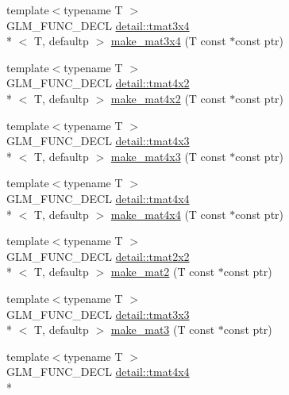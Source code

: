 \begin{DoxyCompactItemize}
{\footnotesize template$<$typename T $>$ }\\G\-L\-M\-\_\-\-F\-U\-N\-C\-\_\-\-D\-E\-C\-L \hyperlink{structglm_1_1detail_1_1tmat3x4}{detail\-::tmat3x4}\\*
$<$ T, defaultp $>$ \hyperlink{group__gtc__type__ptr_gaa0c07ac459a5e16374aa12e3b35ee043}{make\-\_\-mat3x4} (T const $\ast$const ptr)
\item 
{\footnotesize template$<$typename T $>$ }\\G\-L\-M\-\_\-\-F\-U\-N\-C\-\_\-\-D\-E\-C\-L \hyperlink{structglm_1_1detail_1_1tmat4x2}{detail\-::tmat4x2}\\*
$<$ T, defaultp $>$ \hyperlink{group__gtc__type__ptr_gae4ad99adfe4fb195a192712a71de901d}{make\-\_\-mat4x2} (T const $\ast$const ptr)
\item 
{\footnotesize template$<$typename T $>$ }\\G\-L\-M\-\_\-\-F\-U\-N\-C\-\_\-\-D\-E\-C\-L \hyperlink{structglm_1_1detail_1_1tmat4x3}{detail\-::tmat4x3}\\*
$<$ T, defaultp $>$ \hyperlink{group__gtc__type__ptr_ga37ec66362c22d86ad2ee11930b638c4a}{make\-\_\-mat4x3} (T const $\ast$const ptr)
\item 
{\footnotesize template$<$typename T $>$ }\\G\-L\-M\-\_\-\-F\-U\-N\-C\-\_\-\-D\-E\-C\-L \hyperlink{structglm_1_1detail_1_1tmat4x4}{detail\-::tmat4x4}\\*
$<$ T, defaultp $>$ \hyperlink{group__gtc__type__ptr_ga4b13ff6840a66d032724a9a1db50f704}{make\-\_\-mat4x4} (T const $\ast$const ptr)
\item 
{\footnotesize template$<$typename T $>$ }\\G\-L\-M\-\_\-\-F\-U\-N\-C\-\_\-\-D\-E\-C\-L \hyperlink{structglm_1_1detail_1_1tmat2x2}{detail\-::tmat2x2}\\*
$<$ T, defaultp $>$ \hyperlink{group__gtc__type__ptr_ga903422b2c346cbaccad3153a5a1f404c}{make\-\_\-mat2} (T const $\ast$const ptr)
\item 
{\footnotesize template$<$typename T $>$ }\\G\-L\-M\-\_\-\-F\-U\-N\-C\-\_\-\-D\-E\-C\-L \hyperlink{structglm_1_1detail_1_1tmat3x3}{detail\-::tmat3x3}\\*
$<$ T, defaultp $>$ \hyperlink{group__gtc__type__ptr_gae50ecac46eb8771fb074e310b602bf53}{make\-\_\-mat3} (T const $\ast$const ptr)
\item 
{\footnotesize template$<$typename T $>$ }\\G\-L\-M\-\_\-\-F\-U\-N\-C\-\_\-\-D\-E\-C\-L \hyperlink{structglm_1_1detail_1_1tmat4x4}{detail\-::tmat4x4}\\*

\end{DoxyCompactItemize}
